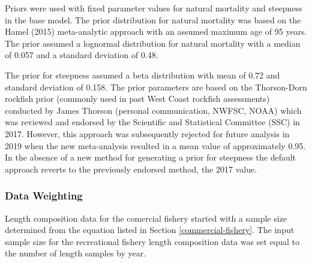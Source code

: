 \documentclass[11pt,
  english,
  a4paper,
]{article}
\begin{document}
\leavevmode\tagmcend\tagstructend


Priors were used with fixed parameter values for natural mortality and steepness in the base model. The prior distribution for natural mortality was based on the Hamel {(2015)\leavevmode\tagmcend\tagstructend} meta-analytic approach with an assumed maximum age of 95 years. The prior assumed a lognormal distribution for natural mortality with a median of 0.057 and a standard deviation of 0.48.

\leavevmode\tagmcend\tagstructend\par


The prior for steepness assumed a beta distribution with mean of 0.72 and standard deviation of 0.158. The prior parameters are based on the Thorson-Dorn rockfish prior (commonly used in past West Coast rockfish assessments) conducted by James Thorson (personal communication, NWFSC, NOAA) which was reviewed and endorsed by the Scientific and Statistical Committee (SSC) in 2017. However, this approach was subsequently rejected for future analysis in 2019 when the new meta-analysis resulted in a mean value of approximately 0.95. In the absence of a new method for generating a prior for steepness the default approach reverts to the previously endorsed method, the 2017 value.

\leavevmode\tagmcend\tagstructend\par


\hypertarget{data-weighting}{%
\subsubsection{Data Weighting}\label{data-weighting}}

\leavevmode\tagmcend\tagstructend


Length composition data for the comercial fishery started with a sample size determined from the equation listed in Section \ref{commercial-fishery}. The input sample size for the recreational fishery length composition data was set equal to the number of length samples by year.

\leavevmode\tagmcend\tagstructend\par
\end{document}
